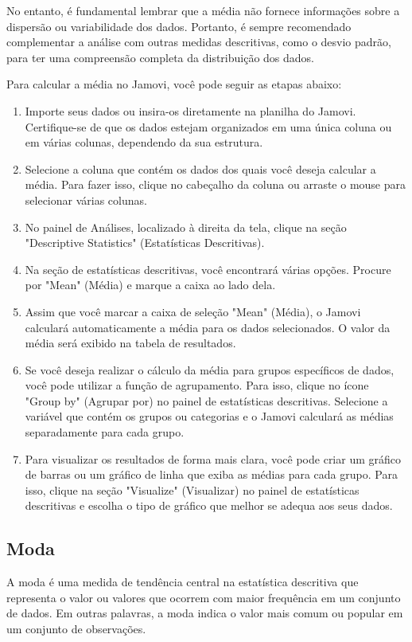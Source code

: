 No entanto, é fundamental lembrar que a média não fornece informações sobre a dispersão ou variabilidade dos dados. Portanto, é sempre recomendado complementar a análise com outras medidas descritivas, como o desvio padrão, para ter uma compreensão completa da distribuição dos dados.

Para calcular a média no Jamovi, você pode seguir as etapas abaixo:

\begin{enumerate}
    \item Importe seus dados ou insira-os diretamente na planilha do Jamovi. Certifique-se de que os dados estejam organizados em uma única coluna ou em várias colunas, dependendo da sua estrutura.
    \item Selecione a coluna que contém os dados dos quais você deseja calcular a média. Para fazer isso, clique no cabeçalho da coluna ou arraste o mouse para selecionar várias colunas.
    \item No painel de Análises, localizado à direita da tela, clique na seção "Descriptive Statistics" (Estatísticas Descritivas).
    \item Na seção de estatísticas descritivas, você encontrará várias opções. Procure por "Mean" (Média) e marque a caixa ao lado dela.
    \item Assim que você marcar a caixa de seleção "Mean" (Média), o Jamovi calculará automaticamente a média para os dados selecionados. O valor da média será exibido na tabela de resultados.
    \item Se você deseja realizar o cálculo da média para grupos específicos de dados, você pode utilizar a função de agrupamento. Para isso, clique no ícone "Group by" (Agrupar por) no painel de estatísticas descritivas. Selecione a variável que contém os grupos ou categorias e o Jamovi calculará as médias separadamente para cada grupo.
    \item Para visualizar os resultados de forma mais clara, você pode criar um gráfico de barras ou um gráfico de linha que exiba as médias para cada grupo. Para isso, clique na seção "Visualize" (Visualizar) no painel de estatísticas descritivas e escolha o tipo de gráfico que melhor se adequa aos seus dados.
\end{enumerate}

\subsection{Moda}

A moda é uma medida de tendência central na estatística descritiva que representa o valor ou valores que ocorrem com maior frequência em um conjunto de dados. Em outras palavras, a moda indica o valor mais comum ou popular em um conjunto de observações.


